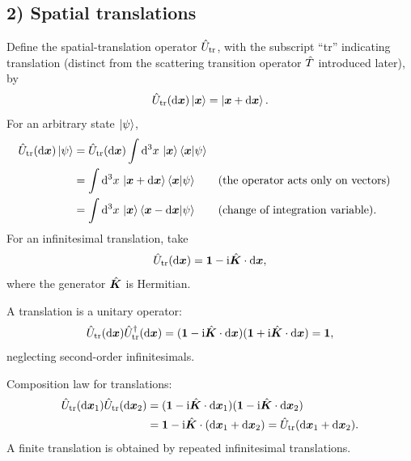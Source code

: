 \subsection*{2) Spatial translations}
Define the spatial-translation operator $\hat{U}_{\mathrm{tr}}$, with the subscript ``tr'' indicating translation (distinct from the scattering transition operator $\hat{T}$ introduced later), by
\begin{equation}
\hat{U}_{\mathrm{tr}}(\mathrm{d}\bm{x})\left|\bm{x}\right\rangle=\left|\bm{x}+\mathrm{d}\bm{x}\right\rangle.
\end{equation}
For an arbitrary state $\left|\psi\right\rangle$,
\begin{equation}\begin{aligned}
\hat{U}_{\mathrm{tr}}(\mathrm{d}\bm{x})\left|\psi\right\rangle
&=\hat{U}_{\mathrm{tr}}(\mathrm{d}\bm{x})\int\mathrm{d}^3x\,\left|\bm{x}\right\rangle\left\langle\bm{x}\middle|\psi\right\rangle\\
&=\int\mathrm{d}^3x\,\left|\bm{x}+\mathrm{d}\bm{x}\right\rangle\left\langle\bm{x}\middle|\psi\right\rangle
&&\text{(the operator acts only on vectors)}\\
&=\int\mathrm{d}^3x\,\left|\bm{x}\right\rangle\left\langle\bm{x}-\mathrm{d}\bm{x}\middle|\psi\right\rangle
&&\text{(change of integration variable).}
\end{aligned}\end{equation}
For an infinitesimal translation, take
\begin{equation}
\hat{U}_{\mathrm{tr}}(\mathrm{d}\bm{x})=\mathbf1-\mathrm{i}\hat{\bm{K}}\cdot\mathrm{d}\bm{x},
\end{equation}
where the generator $\hat{\bm{K}}$ is Hermitian.

A translation is a unitary operator:
\begin{equation}
\hat{U}_{\mathrm{tr}}(\mathrm{d}\bm{x})\hat{U}_{\mathrm{tr}}^\dagger(\mathrm{d}\bm{x})
=(\mathbf1-\mathrm{i}\hat{\bm{K}}\cdot\mathrm{d}\bm{x})
 (\mathbf1+\mathrm{i}\hat{\bm{K}}\cdot\mathrm{d}\bm{x})
=\mathbf1,
\end{equation}
neglecting second-order infinitesimals.

Composition law for translations:
\begin{equation}\begin{aligned}
\hat{U}_{\mathrm{tr}}(\mathrm{d}\bm{x}_1)\hat{U}_{\mathrm{tr}}(\mathrm{d}\bm{x}_2)
&=(\mathbf1-\mathrm{i}\hat{\bm{K}}\cdot\mathrm{d}\bm{x}_1)
(\mathbf1-\mathrm{i}\hat{\bm{K}}\cdot\mathrm{d}\bm{x}_2)\\
&=\mathbf1-\mathrm{i}\hat{\bm{K}}\cdot(\mathrm{d}\bm{x}_1+\mathrm{d}\bm{x}_2)
=\hat{U}_{\mathrm{tr}}(\mathrm{d}\bm{x}_1+\mathrm{d}\bm{x}_2).
\end{aligned}\end{equation}
A finite translation is obtained by repeated infinitesimal translations.

